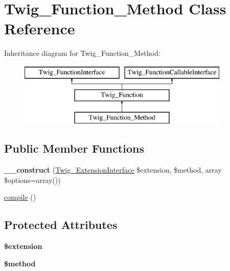 \hypertarget{class_twig___function___method}{}\section{Twig\+\_\+\+Function\+\_\+\+Method Class Reference}
\label{class_twig___function___method}
Inheritance diagram for Twig\+\_\+\+Function\+\_\+\+Method\+:\begin{figure}[H]
\begin{center}
\leavevmode
\includegraphics[height=3.000000cm]{class_twig___function___method}
\end{center}
\end{figure}
\subsection*{Public Member Functions}
\begin{DoxyCompactItemize}
\item 
\hypertarget{class_twig___function___method_a7d07ee619832b0ff21eaf3c7c0159c3f}{}{\bfseries \+\_\+\+\_\+construct} (\hyperlink{interface_twig___extension_interface}{Twig\+\_\+\+Extension\+Interface} \$extension, \$method, array \$options=array())\label{class_twig___function___method_a7d07ee619832b0ff21eaf3c7c0159c3f}

\item 
\hyperlink{class_twig___function___method_a3815e7c2e73f00c2ebffcf5b90eef3b1}{compile} ()
\end{DoxyCompactItemize}
\subsection*{Protected Attributes}
\begin{DoxyCompactItemize}
\item 
\hypertarget{class_twig___function___method_aed02cd2cd0ee08bd99a2ac1ef4f955ce}{}{\bfseries \$extension}\label{class_twig___function___method_aed02cd2cd0ee08bd99a2ac1ef4f955ce}

\item 
\hypertarget{class_twig___function___method_a12661b2fc0f57f97e30a1620889ce9c6}{}{\bfseries \$method}\label{class_twig___function___method_a12661b2fc0f57f97e30a1620889ce9c6}

\end{DoxyCompactItemize}


